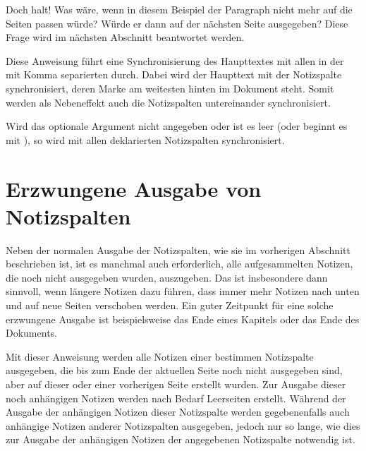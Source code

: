 Doch halt! Was wäre, wenn in diesem Beispiel der Paragraph nicht mehr auf die
Seiten passen würde? Würde er dann auf der nächsten Seite ausgegeben? Diese
Frage wird im nächsten Abschnitt beantwortet werden.
\EndIndexGroup


\begin{Declaration}
\end{Declaration}
Diese Anweisung führt eine Synchronisierung des Haupttextes mit allen in der
mit Komma separierten  durch. Dabei wird der
Haupttext mit der Notizspalte synchronisiert, deren Marke am weitesten hinten
im Dokument steht. Somit werden als Nebeneffekt auch die Notizspalten
untereinander synchronisiert.

Wird das optionale Argument nicht angegeben oder ist es leer (oder beginnt es
mit ), so wird mit allen deklarierten Notizspalten
synchronisiert.%
\EndIndexGroup


\section{Erzwungene Ausgabe von Notizspalten}

Neben der normalen Ausgabe der Notizspalten, wie sie im vorherigen Abschnitt
beschrieben ist, ist es manchmal auch erforderlich, alle aufgesammelten
Notizen, die noch nicht ausgegeben wurden, auszugeben. Das ist insbesondere
dann sinnvoll, wenn längere Notizen dazu führen, dass immer mehr Notizen nach
unten und auf neue Seiten verschoben werden. Ein guter Zeitpunkt für eine
solche erzwungene Ausgabe ist beispielsweise das
Ende eines Kapitels oder das Ende des Dokuments.

\begin{Declaration}
\end{Declaration}
Mit dieser Anweisung werden alle Notizen einer bestimmen Notizspalte
ausgegeben, die
bis zum Ende der aktuellen Seite noch nicht ausgegeben sind, aber auf dieser
oder einer vorherigen Seite erstellt wurden. Zur Ausgabe dieser noch
anhängigen Notizen werden nach Bedarf Leerseiten erstellt. Während der Ausgabe
der anhängigen Notizen dieser Notizspalte werden gegebenenfalls auch anhängige
Notizen anderer Notizspalten ausgegeben, jedoch nur so lange, wie dies zur
Ausgabe der anhängigen Notizen der angegebenen Notizspalte notwendig ist.

